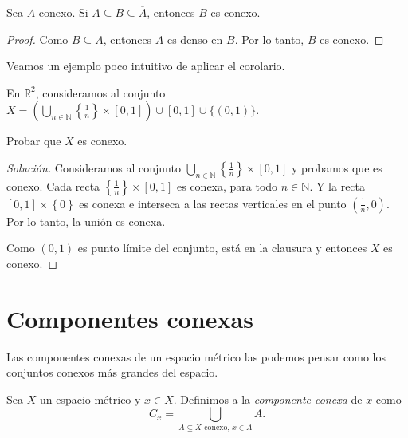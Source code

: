 \begin{corollary}
	Sea $A$ conexo. Si $A \subseteq B \subseteq \overline{A}$, entonces $B$ es conexo.
\end{corollary}

\begin{proof}
	Como $B \subseteq \overline{A}$, entonces $A$ es denso en $B$. Por lo tanto, $B$ es conexo.
\end{proof}

Veamos un ejemplo poco intuitivo de aplicar el corolario.

\begin{example}
	En $\mathbb{R}^{2}$, consideramos al conjunto $X = (\bigcup_{n \in \mathbb{N}} \left\{ \frac{1}{n} \right\} \times [0, 1]) \cup [0, 1] \cup \{(0, 1)\}$.

	\begin{center}
		
	\end{center}

	Probar que $X$ es conexo.
\end{example}

\begin{proof}[Solución]
	Consideramos al conjunto $\bigcup_{n \in \mathbb{N}} \left\{ \frac{1}{n} \right\} \times [0, 1]$ y probamos que es conexo. Cada recta $\left\{ \frac{1}{n} \right\} \times [0, 1]$ es conexa, para todo $n \in \mathbb{N}$. Y la recta $[0, 1] \times \left\{ 0 \right\}$ es conexa e interseca a las rectas verticales en el punto $(\frac{1}{n}, 0)$. Por lo tanto, la unión es conexa.

	Como $(0, 1)$ es punto límite del conjunto, está en la clausura y entonces $X$ es conexo.
\end{proof}

\section{Componentes conexas}

Las componentes conexas de un espacio métrico las podemos pensar como los conjuntos conexos más grandes del espacio.

\begin{definition}
	Sea $X$ un espacio métrico y $x \in X$. Definimos a la \emph{componente conexa} de $x$ como
	\begin{equation*}
		C_x = \bigcup_{A \subseteq X \text{ conexo, } x \in A} A.
	\end{equation*}
\end{definition}

